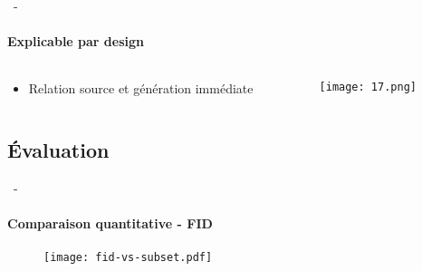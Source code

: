 \documentclass[aspectratio=169, 22pt]{beamer}
\begin{document}

\begin{frame}{\secname~- \subsecname}
  \framesubtitle{Explicable par design}
  \begin{columns}
    \begin{column}{0.4\linewidth}
      \begin{itemize}
      \item Relation \alert{source} et \alert{génération} immédiate
      \end{itemize}
    \end{column}
    \begin{column}{0.6\linewidth}
      \begin{figure}
        \texttt{[image: 17.png]}
      \end{figure}  
    \end{column}
  \end{columns}  
\end{frame}

\subsection{Évaluation}
\begin{frame}{\secname~- \subsecname}
  \framesubtitle{Comparaison quantitative - FID}
  \begin{figure}
    \texttt{[image: fid-vs-subset.pdf]}
  \end{figure}
\end{frame}
\end{document}
